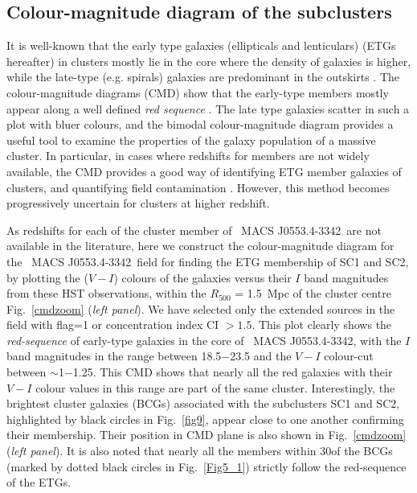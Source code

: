 \documentclass[useASM,usenatbib]{mn2e}
\newcommand{\mac}{\rm~MACS J0553.4-3342}
\begin{document}
 
\subsection{Colour-magnitude diagram of the subclusters}
\label{cmd}
It is well-known that the early type galaxies (ellipticals and
lenticulars) (ETGs hereafter) in clusters mostly lie in the core where
the density of galaxies is higher, while the late-type (e.g. spirals)
galaxies are predominant in the outskirts
\citep[e.g.][]{2013A&A...556C...4N,2014A&A...565A..13M}. The
colour-magnitude diagrams (CMD)
show that the early-type
members mostly appear along a well defined \textit{red sequence}
\citep[e.g.][]{2004AJ....127.2484H,2005yCat..21570001G,
  2005ApJ...634L.129S,2005ApJ...623..721P, 2005ApJ...625..121M}.
The late type galaxies scatter in such a plot with bluer colours, and
the bimodal colour-magnitude diagram provides a
useful tool to examine the properties of the galaxy population of a
massive cluster. In particular, in cases where redshifts for members are
not widely available, the CMD provides a good way of identifying ETG member
galaxies of clusters, and quantifying field contamination
\citep[e.g.][]{1998ApJ...492..461S,2001MNRAS.321...18K,2007MNRAS.374..809D}.
However, this method becomes progressively uncertain for clusters
at higher redshift.


As redshifts for each of the cluster member of \mac\ are not available
in the literature, here we construct the colour-magnitude diagram for
the \mac\ field for finding the ETG membership of SC1 and SC2, by
plotting the ($V-I$) colours of the
galaxies versus their $I$ band magnitudes from these HST observations,
within the $R_{500}$ = 1.5~Mpc of the cluster centre Fig.~\ref{cmdzoom} ({\it left panel}).
We have selected only the
extended sources in the field with flag=1 or concentration index CI $> 1.5$. This plot clearly shows the \textit{red-sequence} of early-type
galaxies in the core of \mac, with the $I$ band magnitudes in
the range between 18.5$-$23.5 and the $V-I$ colour-cut between
$\sim$1$-$1.25. This CMD shows that nearly
all the red galaxies with their $V-I$ colour values in this
range are part of the same cluster. Interestingly, the
brightest cluster galaxies (BCGs) associated with the subclusters SC1
and SC2, highlighted by black circles in Fig.~\ref{fig9},
appear close to one another confirming their membership. Their position in CMD plane is also shown in Fig.~\ref{cmdzoom} ({\it left panel}). It is also noted that nearly all the members within 30\arcsec of the BCGs (marked by dotted black circles in Fig.~\ref{Fig5_1}) strictly follow the red-sequence of the ETGs. 
\end{document}
